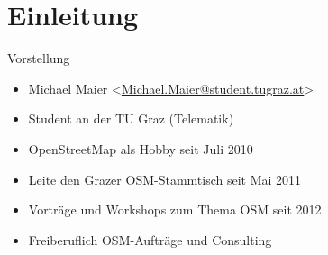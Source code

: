 \documentclass{beamer}
\begin{document}



\section{Einleitung}

\begin{frame}{Vorstellung}

  \begin{itemize}
    \item Michael Maier \textless \href{mailto:Michael.Maier@student.tugraz.at}{Michael.Maier@student.tugraz.at}\textgreater
    \item Student an der TU Graz (Telematik)
\vspace{0.3cm}
    \item OpenStreetMap als Hobby seit Juli 2010
    \item Leite den Grazer OSM-Stammtisch seit Mai 2011
\vspace{0.3cm}
    \item Vorträge und Workshops zum Thema OSM seit 2012
    \item Freiberuflich OSM-Aufträge und Consulting
  \end{itemize}
\end{frame}



\end{document}
